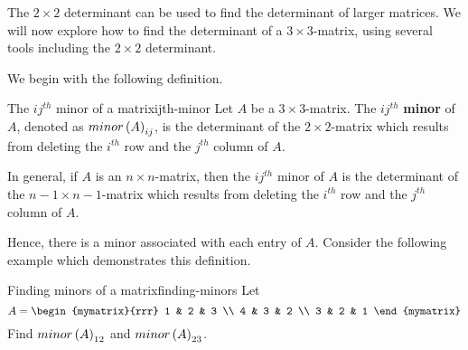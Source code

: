 The $2 \times 2$ determinant can be used to find the determinant of larger matrices.
We will now explore how to find the determinant of a $3 \times 3$-matrix, using several tools
including the $2 \times 2$ determinant.

We begin with the following definition. 

\begin{definition}{The $ij^{th}$ minor of a matrix}{ijth-minor}
Let $A$ be a $3\times 3$-matrix. The $ij^{th}$ \textbf{minor} of $A$, denoted as $minor\left(A\right) _{ij}$, is the determinant
of the $2\times 2$-matrix which results from deleting the $i^{th}$ row and
the $j^{th}$ column of $A$.

In general, if $A$ is an $n\times n$-matrix, then the $ij^{th}$ minor of $A$ is the determinant of the $n-1 \times n-1$-matrix which results from deleting the $i^{th}$ row and the $j^{th}$ column of $A$. 
\end{definition}

Hence, there is a minor associated with each entry of $A$. Consider the following example which demonstrates this definition. 

\begin{example}{Finding minors of a matrix}{finding-minors}
Let 
\begin{equation*}
A = \begin{mymatrix}{rrr}
1 & 2 & 3 \\
4 & 3 & 2 \\
3 & 2 & 1
\end{mymatrix} 
\end{equation*}
Find $minor\left(A\right) _{12}$ and $minor\left(A\right) _{23}$.
\end{example}

